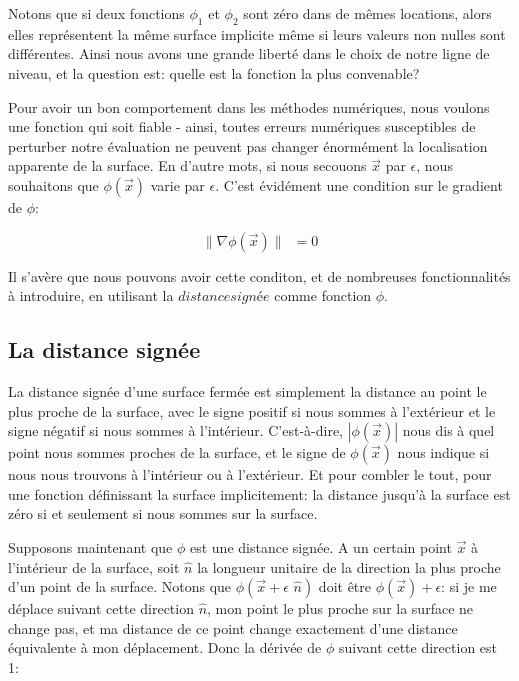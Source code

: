 \documentclass[11pt]{report}
\begin{document}
Notons que si deux fonctions $\phi_1$ et $\phi_2$ sont zéro dans de mêmes locations, alors elles représentent la même surface implicite même si leurs valeurs non nulles sont différentes. Ainsi nous avons une grande liberté dans le choix de notre ligne de niveau, et la question est: quelle est la fonction la plus convenable?\newline

Pour avoir un bon comportement dans les méthodes numériques, nous voulons une fonction qui soit fiable - ainsi, toutes erreurs numériques susceptibles de perturber notre évaluation ne peuvent pas changer énormément la localisation apparente de la surface. En d'autre mots, si nous secouons $\overrightarrow{x}$ par $\epsilon$, nous souhaitons que $\phi(\overrightarrow{x})$ varie par $\epsilon$. C'est évidément une condition sur le gradient de $\phi$:

\begin{equation}
\| \nabla \phi (\overrightarrow{x}) \| \,\,\, = 0
\end{equation}

Il s'avère que nous pouvons avoir cette conditon, et de nombreuses fonctionnalités à introduire, en utilisant la $distance signée$ comme fonction $\phi$.

\subsection{La distance signée}

La distance signée d'une surface fermée est simplement la distance au point le plus proche de la surface, avec le signe positif si nous sommes à l'extérieur et le signe négatif si nous sommes à l'intérieur. C'est-à-dire, $|\phi (\overrightarrow{x})|$ nous dis à quel point nous sommes proches de la surface, et le signe de $\phi (\overrightarrow{x})$ nous indique si nous nous trouvons à l'intérieur ou à l'extérieur. Et pour combler le tout, pour une fonction définissant la surface implicitement: la distance jusqu'à la surface est zéro si et seulement si nous sommes sur la surface.\newline

Supposons maintenant que $\phi$ est une distance signée. A un certain point $\overrightarrow{x}$ à l'intérieur de la surface, soit $\hat{n}$ la longueur unitaire de la direction la plus proche d'un point de la surface. Notons que $\phi (\overrightarrow{x} + \epsilon\,\,\hat{n})$ doit être $\phi (\overrightarrow{x}) + \epsilon$: si je me déplace suivant cette direction $\hat{n}$, mon point le plus proche sur la surface ne change pas, et ma distance de ce point change exactement d'une distance équivalente à mon déplacement. Donc la dérivée de $\phi$ suivant cette direction est 1:
\end{document}
